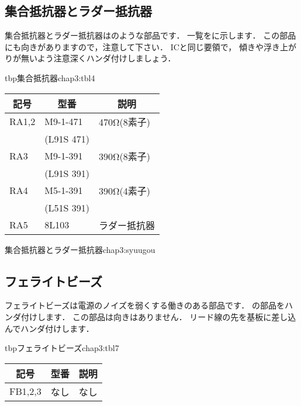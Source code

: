 
\subsection{集合抵抗器とラダー抵抗器}
集合抵抗器とラダー抵抗器はのような部品です．
一覧をに示します．
この部品にも向きがありますので，注意して下さい．
ICと同じ要領で，
傾きや浮き上がりが無いよう注意深くハンダ付けしましょう．

\begin{mytable}{tbp}{集合抵抗器}{chap3:tbl4}
{\small\begin{tabular}{l|l|l}
\hline
\hline
\multicolumn{1}{c|}{記号} &
\multicolumn{1}{c|}{型番} &
\multicolumn{1}{c}{説明} \\
\hline
RA1,2 & M9-1-471 & 470Ω(8素子)  \\
      &(L91S 471)&               \\
RA3   & M9-1-391 & 390Ω(8素子)  \\
      &(L91S 391)&               \\
RA4   & M5-1-391 & 390Ω(4素子)  \\
      &(L51S 391)&               \\
RA5   & 8L103    & ラダー抵抗器 \\
\end{tabular}}
\end{mytable}

{集合抵抗器とラダー抵抗器}{chap3:syuugou}

\subsection{フェライトビーズ}
フェライトビーズは電源のノイズを弱くする働きのある部品です．
の部品をハンダ付けします．
この部品は向きはありません．
リード線の先を基板に差し込んでハンダ付けします．

\begin{mytable}{tbp}{フェライトビーズ}{chap3:tbl7}
{\small\begin{tabular}{l|l|l}
\hline
\hline
\multicolumn{1}{c|}{記号} &
\multicolumn{1}{c|}{型番} &
\multicolumn{1}{c}{説明} \\
\hline
FB1,2,3 & なし & なし \\
\end{tabular}}
\end{mytable}

